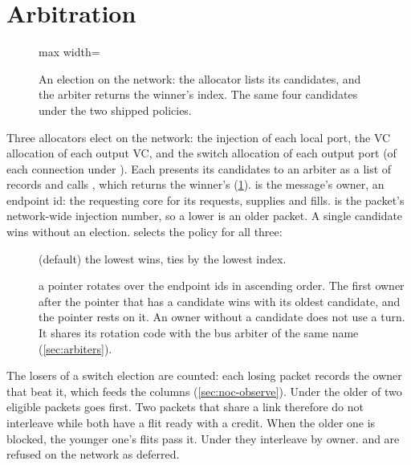 \section{Arbitration}\label{sec:noc-arbitration}

\begin{figure}[htbp]\centering
\begin{adjustbox}{max width=\textwidth}\end{adjustbox}
\caption{An election on the network: the allocator lists its candidates, and the arbiter returns
the winner's index. The same four candidates under the two shipped policies.}
\label{fig:noc-arbitration}
\end{figure}

Three allocators elect on the network: the injection of each local port, the VC allocation of each
output VC, and the switch allocation of each output port (of each connection under
). Each presents its candidates to an arbiter as a list of
 records and calls
, which returns the winner's 
(\cref{fig:noc-arbitration}).  is the message's owner, an endpoint id: the
requesting core for its requests, supplies and fills.  is the packet's network-wide
injection number, so a lower  is an older packet. A single candidate wins without an
election.  selects the policy for all three:

\begin{description}
\item[] (default) the lowest  wins, ties by the lowest index.
\item[] a pointer rotates over the endpoint ids in ascending order. The first
  owner after the pointer that has a candidate wins with its oldest candidate, and the pointer
  rests on it. An owner without a candidate does not use a turn. It shares its rotation code with
  the bus arbiter of the same name (\cref{sec:arbiters}).
\end{description}

The losers of a switch election are counted: each losing packet records the owner that beat it,
which feeds the  columns (\cref{sec:noc-observe}). Under  the
older of two eligible packets goes first. Two packets that share a link therefore do not
interleave while both have a flit ready with a credit. When the older one is blocked, the younger
one's flits pass it. Under  they interleave by owner.  and  are refused on the network
as deferred.

